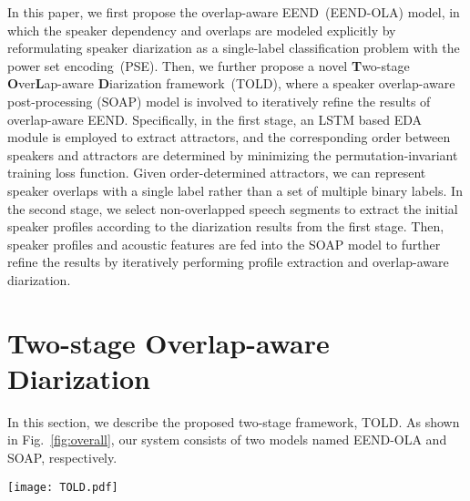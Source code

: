 \documentclass{article}
\begin{document}
In this paper, we first propose the overlap-aware EEND~(EEND-OLA) model, in which the speaker dependency and overlaps are modeled explicitly by reformulating speaker diarization as a single-label classification problem with the power set encoding~(PSE).
Then, we further propose a novel \textbf{T}wo-stage \textbf{O}ver\textbf{L}ap-aware \textbf{D}iarization framework~(TOLD), where a speaker overlap-aware post-processing (SOAP) model is involved to iteratively refine the results of overlap-aware EEND.
Specifically, in the first stage, an LSTM based EDA module is employed to extract attractors, and the corresponding order between speakers and attractors are determined by minimizing the permutation-invariant training loss function. Given order-determined attractors, we can represent speaker overlaps with a single label rather than a set of multiple binary labels. In the second stage, we select non-overlapped speech segments to extract the initial speaker profiles according to the diarization results from the first stage. Then, speaker profiles and acoustic features are fed into the SOAP model to further refine the results by iteratively performing profile extraction and overlap-aware diarization.

\section{Two-stage Overlap-aware Diarization}
In this section, we describe the proposed two-stage framework, TOLD. As shown in Fig.~\ref{fig:overall}, our system consists of two models named EEND-OLA and SOAP, respectively.




\begin{figure*}[htb]
  \centering
  \texttt{[image: TOLD.pdf]}
  \caption{The overall architecture of the proposed method, TOLD, where $\oplus$ denotes concatenation operation.}
  \label{fig:overall}
\end{figure*}
\end{document}

